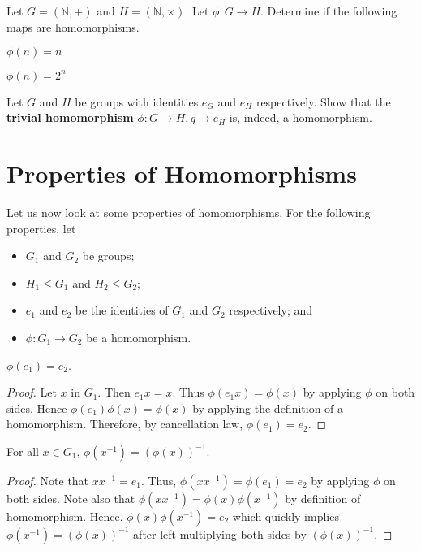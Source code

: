 \begin{exercise}
    Let $G = (\mathbb{N}, +)$ and $H = (\mathbb{N}, \times)$. Let $\phi: G \to H$. Determine if the following maps are homomorphisms.
    \begin{partquestions}{\alph*}
        \item $\phi(n) = n$
        \item $\phi(n) = 2^n$
    \end{partquestions}
\end{exercise}
\begin{exercise}
    Let $G$ and $H$ be groups with identities $e_G$ and $e_H$ respectively. Show that the \textbf{trivial homomorphism} $\phi: G \to H, g \mapsto e_H$ is, indeed, a homomorphism.
\end{exercise}

\section{Properties of Homomorphisms}
Let us now look at some properties of homomorphisms. For the following properties, let
\begin{itemize}
    \item $G_1$ and $G_2$ be groups;
    \item $H_1 \leq G_1$ and $H_2 \leq G_2$;
    \item $e_1$ and $e_2$ be the identities of $G_1$ and $G_2$ respectively; and
    \item $\phi: G_1 \to G_2$ be a homomorphism.
\end{itemize}

\begin{proposition}\label{prop-homomorphism-maps-identities-to-each-other}
    $\phi(e_1) = e_2$.
\end{proposition}
\begin{proof}
    Let $x$ in $G_1$. Then $e_1x = x$. Thus $\phi(e_1x) = \phi(x)$ by applying $\phi$ on both sides. Hence $\phi(e_1)\phi(x) = \phi(x)$ by applying the definition of a homomorphism. Therefore, by cancellation law, $\phi(e_1) = e_2$.
\end{proof}

\begin{proposition}\label{prop-homomorphism-maps-inverses}
    For all $x \in G_1$, $\phi(x^{-1}) = \left(\phi(x)\right)^{-1}$.
\end{proposition}
\begin{proof}
    Note that $xx^{-1} = e_1$. Thus, $\phi(xx^{-1}) = \phi(e_1) = e_2$ by applying $\phi$ on both sides. Note also that $\phi(xx^{-1}) = \phi(x)\phi(x^{-1})$ by definition of homomorphism. Hence, $\phi(x)\phi(x^{-1}) = e_2$ which quickly implies $\phi(x^{-1}) = \left(\phi(x)\right)^{-1}$ after left-multiplying both sides by $\left(\phi(x)\right)^{-1}$.
\end{proof}

